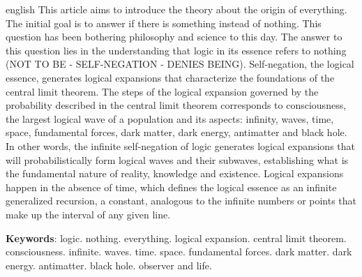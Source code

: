 \vspace{-5mm}
\renewcommand{\resumoname}{Abstract}
\begin{resumoumacoluna}
 \begin{otherlanguage*}{english}
	\vspace{-2mm}
	This article aims to introduce the theory about the origin of everything. The initial goal is to answer if there is something instead of nothing. This question has been bothering philosophy and science to this day. The answer to this question lies in the understanding that logic in its essence refers to nothing (NOT TO BE - SELF-NEGATION - DENIES BEING). Self-negation, the logical essence, generates logical expansions that characterize the foundations of the central limit theorem. The steps of the logical expansion governed by the probability described in the central limit theorem corresponds to consciousness, the largest logical wave of a population and its aspects: infinity, waves, time, space, fundamental forces, dark matter, dark energy, antimatter and black hole. In other words, the infinite self-negation of logic generates logical expansions that will probabilistically form logical waves and their subwaves, establishing what is the fundamental nature of reality, knowledge and existence. Logical expansions happen in the absence of time, which defines the logical essence as an infinite generalized recursion, a constant, analogous to the infinite numbers or points that make up the interval of any given line.
	\vspace{\onelineskip}  
	
	\noindent
	\textbf{Keywords}: logic. nothing. everything. logical expansion. central limit theorem. consciousness. infinite. waves. time. space. fundamental forces. dark matter. dark energy. antimatter. black hole. observer and life.
 \end{otherlanguage*}  
\end{resumoumacoluna}
